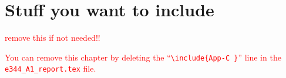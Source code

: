 \chapter{Stuff you want to include}

\textcolor{red}{remove this if not needed!! \\} 

\textcolor{red}{You can remove this chapter by deleting the ``\texttt{\textbackslash include\{App-C \}}'' line in the \texttt{e344\_A1\_report.tex} file.  }

\lipsum
